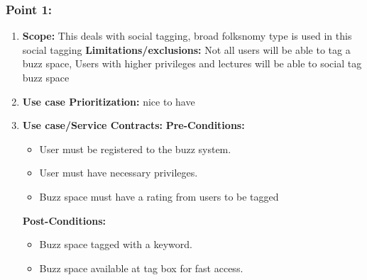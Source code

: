 \documentclass[11pt]{article}
\begin{document}
\subsubsection{Point 1:} 
\begin{enumerate}
\item 
\textbf{Scope:}
This deals with social tagging, broad folksnomy type is used in this social tagging
\newline
\textbf{Limitations/exclusions:} 
Not all users will be able to tag a buzz space, Users with higher privileges and lectures will be able to social tag buzz space

\item 
\textbf{Use case Prioritization:} nice to have

\item 
\textbf{Use case/Service Contracts:} 
\newline
\textbf{Pre-Conditions: }
\begin{itemize}
\item User must be registered to the buzz system.
\item User must have necessary privileges.
\item Buzz space must have a rating from users to be tagged
\end{itemize}
 

\textbf{Post-Conditions: }
\begin{itemize}
\item Buzz space tagged with a keyword.
\item Buzz space available at tag box for fast access.
\end{itemize}
\end{enumerate}
\end{document}
